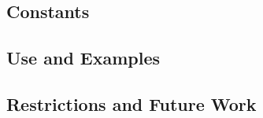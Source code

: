 \documentclass[english]{article}
\begin{document}
\subsection{Constants}

\subsection{Use and Examples}


\subsection{Restrictions and Future Work}


\end{document}

